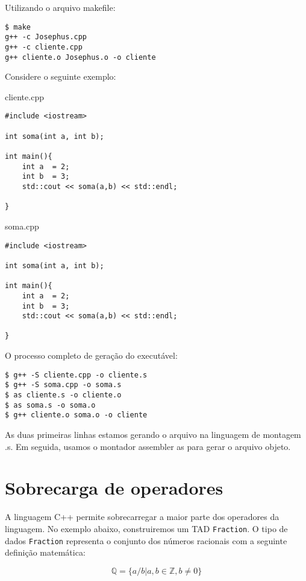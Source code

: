 Utilizando o arquivo makefile:

\begin{verbatim}
$ make
g++ -c Josephus.cpp
g++ -c cliente.cpp
g++ cliente.o Josephus.o -o cliente 
\end{verbatim}

Considere o seguinte exemplo:

cliente.cpp
\begin{verbatim}
#include <iostream>

int soma(int a, int b);

int main(){
    int a  = 2;
    int b  = 3;
    std::cout << soma(a,b) << std::endl;

}
\end{verbatim}

soma.cpp
\begin{verbatim}
#include <iostream>

int soma(int a, int b);

int main(){
    int a  = 2;
    int b  = 3;
    std::cout << soma(a,b) << std::endl;

}
\end{verbatim}

O processo completo de geração do executável:

\begin{verbatim}
$ g++ -S cliente.cpp -o cliente.s
$ g++ -S soma.cpp -o soma.s
$ as cliente.s -o cliente.o
$ as soma.s -o soma.o
$ g++ cliente.o soma.o -o cliente

\end{verbatim}

As duas primeiras linhas estamos gerando o arquivo na linguagem de montagem .s. Em seguida, usamos o montador assembler as para gerar o arquivo objeto.







\section{Sobrecarga de operadores}

A linguagem C++ permite sobrecarregar a maior parte dos operadores da linguagem. No exemplo abaixo, construiremos um TAD \texttt{Fraction}. O tipo de dados \texttt{Fraction} representa o conjunto dos números racionais com a seguinte definição matemática:

\begin{equation}
    \mathbb{Q} = \{ a/b | a,b \in \mathbb{Z}, b \neq 0\}
\end{equation}

